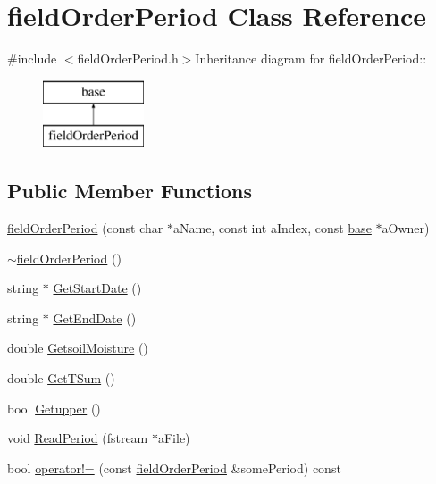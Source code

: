 \hypertarget{classfield_order_period}{
\section{fieldOrderPeriod Class Reference}
\label{classfield_order_period}
}


{\ttfamily \#include $<$fieldOrderPeriod.h$>$}Inheritance diagram for fieldOrderPeriod::\begin{figure}[H]
\begin{center}
\leavevmode
\includegraphics[height=2cm]{classfield_order_period}
\end{center}
\end{figure}
\subsection*{Public Member Functions}
\begin{DoxyCompactItemize}
\item 
\hyperlink{classfield_order_period_a7b87f98d6752ac96c548f5d5a03bc246}{fieldOrderPeriod} (const char $\ast$aName, const int aIndex, const \hyperlink{classbase}{base} $\ast$aOwner)
\item 
\hyperlink{classfield_order_period_a06fd0ce9beee7e55bebc167ee3f4ff19}{$\sim$fieldOrderPeriod} ()
\item 
string $\ast$ \hyperlink{classfield_order_period_aa6caf9c2f95ac68cccd1d5cac9ee73ae}{GetStartDate} ()
\item 
string $\ast$ \hyperlink{classfield_order_period_a5f4352cf8028de7e8746d942c5139b90}{GetEndDate} ()
\item 
double \hyperlink{classfield_order_period_a794b8b4ad31e8f98d940a9be0056b690}{GetsoilMoisture} ()
\item 
double \hyperlink{classfield_order_period_a588c0865c3672ebf99ab2b524c025d0e}{GetTSum} ()
\item 
bool \hyperlink{classfield_order_period_aa35a37c68eab8f59a8ce71aa7f58f0b8}{Getupper} ()
\item 
void \hyperlink{classfield_order_period_a7fec8413b4a89e241b3fb02260e489b6}{ReadPeriod} (fstream $\ast$aFile)
\item 
bool \hyperlink{classfield_order_period_ad002bb65c92106b8703d4a61501ab071}{operator!=} (const \hyperlink{classfield_order_period}{fieldOrderPeriod} \&somePeriod) const 
\end{DoxyCompactItemize}
